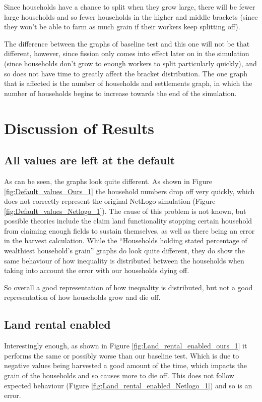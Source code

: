 \documentclass[12pt]{article}
\begin{document}
				Since households have a chance to split when they grow large, there will be fewer large households and so fewer households in the higher and middle brackets (since they won’t be able to farm as much grain if their workers keep splitting off). 
			
				The difference between the graphs of baseline test and this one will not be that different, however, since fission only comes into effect later on in the simulation (since households don’t grow to enough workers to split particularly quickly), and so does not have time to greatly affect the bracket distribution. The one graph that is affected is the number of households and settlements graph, in which the number of households begins to increase towards the end of the simulation.
		\section{Discussion of Results}
		
			\subsection{All values are left at the default}
				As can be seen, the graphs look quite different. As shown in Figure \ref{fig:Default_values_Ours_1} the household numbers drop off very quickly, which does not correctly represent the original NetLogo simulation (Figure \ref{fig:Default_values_Netlogo_1}). The cause of this problem is not known, but possible theories include the claim land functionality stopping certain household from claiming enough fields to sustain themselves, as well as there being an error in the harvest calculation. 
				While the “Households holding stated percentage of wealthiest household’s grain” graphs do look quite different, they do show the same behaviour of how inequality is distributed between the households when taking into account the error with our households dying off.
		
				So overall a good representation of how inequality is distributed, but not a good representation of how households grow and die off.
		
			\subsection{Land rental enabled}
				Interestingly enough, as shown in Figure \ref{fig:Land_rental_enabled_ours_1} it performs the same or possibly worse than our baseline test. Which is due to negative values being harvested a good amount of the time, which impacts the grain of the households and so causes more to die off. This does not follow expected behaviour (Figure \ref{fig:Land_rental_enabled_Netlogo_1}) and so is an error.
		
\end{document}

